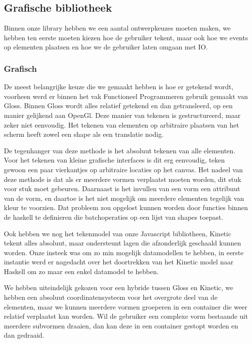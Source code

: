 \subsection{Grafische bibliotheek} \label{subsec:grafische_bibliotheek}

Binnen onze library hebben we een aantal ontwerpkeuzes moeten maken, we hebben ten eerste moeten kiezen hoe de gebruiker tekent, maar ook hoe we events op elementen plaatsen en hoe we de gebruiker laten omgaan met IO.

\subsubsection{Grafisch}
De meest belangrijke keuze die we gemaakt hebben is hoe er getekend wordt, voorheen werd er binnen het vak Functioneel Programmeren gebruik gemaakt van Gloss. Binnen Gloss wordt alles relatief getekend en dan getransleerd, op een manier gelijkend aan OpenGl. Deze manier van tekenen is gestructureerd, maar zeker niet eenvoudig. Het tekenen van elementen op arbitraire plaatsen van het scherm heeft zowel een shape als een translatie nodig.

De tegenhanger van deze methode is het absoluut tekenen van alle elementen. Voor het tekenen van kleine grafische interfaces is dit erg eenvoudig, teken gewoon een paar vierkantjes op arbitraire locaties op het canvas. Het nadeel van deze methode is dat als er meerdere vormen verplaatst moeten worden, dit stuk voor stuk moet gebeuren. Daarnaast is het invullen van een vorm een attribuut van de vorm, en daartoe is het niet mogelijk om meerdere elementen tegelijk van kleur te voorzien. Dat probleem zou opgelost kunnen worden door functies binnen de haskell te definieren die batchoperaties op een lijst van shapes toepast.

Ook hebben we nog het tekenmodel van onze Javascript bibliotheen, Kinetic tekent alles absoluut, maar ondersteunt lagen die afzonderlijk geschaald kunnen worden. Onze insteek was om zo min mogelijk datamodellen te hebben, in eerste instantie werd er nagedacht over het doortrekken van het Kinetic model naar Haskell om zo maar een enkel datamodel te hebben.

We hebben uiteindelijk gekozen voor een hybride tussen Gloss en Kinetic, we hebben een absoluut coordinatensysteem voor het overgrote deel van de elementen, maar we kunnen meerdere vormen groeperen in een container die weer relatief verplaatst kan worden. Wil de gebruiker een complexe vorm bestaande uit meerdere subvormen draaien, dan kan deze in een container gestopt worden en dan gedraaid.

